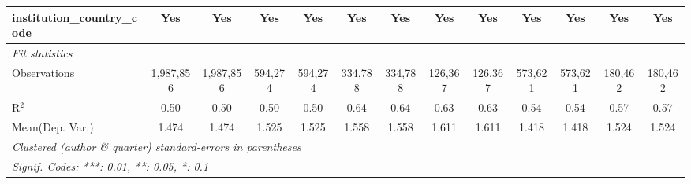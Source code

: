 \begin{tabular}{lcccccccccccc}
   institution\_country\_code               & Yes            & Yes            & Yes            & Yes            & Yes            & Yes           & Yes           & Yes          & Yes            & Yes           & Yes           & Yes\\  
   \midrule
   \emph{Fit statistics}\\
   Observations                             & 1,987,856      & 1,987,856      & 594,274        & 594,274        & 334,788        & 334,788       & 126,367       & 126,367      & 573,621        & 573,621       & 180,462       & 180,462\\  
   R$^2$                                    & 0.50           & 0.50           & 0.50           & 0.50           & 0.64           & 0.64          & 0.63          & 0.63         & 0.54           & 0.54          & 0.57          & 0.57\\  
Mean(Dep. Var.) & 1.474 & 1.474 & 1.525 & 1.525 & 1.558 & 1.558 & 1.611 & 1.611 & 1.418 & 1.418 & 1.524 & 1.524 \\
   \midrule \midrule
   \multicolumn{13}{l}{\emph{Clustered (author \& quarter) standard-errors in parentheses}}\\
   \multicolumn{13}{l}{\emph{Signif. Codes: ***: 0.01, **: 0.05, *: 0.1}}\\
\end{tabular}
\par\endgroup
